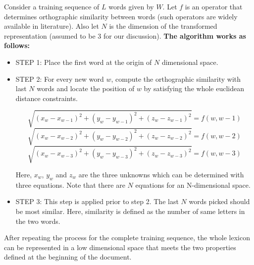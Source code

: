 \documentclass[a4paper, 11pt, oneside]{Thesis}  %
\begin{document}
Consider a training sequence of \(L\) words given by \(W\). Let \(f\) is an operator that determines orthographic similarity between words (such operators are widely available in literature). Also let \(N\) is the dimension of the transformed representation (assumed to be 3 for our discussion). \textbf{The algorithm works as follows:}

\begin{itemize}
\item STEP 1: Place the first word at the origin of \(N\) dimensional space.
\item STEP 2: For every new word \(w\), compute the orthographic similarity with last \(N\) words and locate the position of \(w\) by satisfying the whole euclidean distance constraints.

\begin{equation}
{\sqrt{(x_w - x_{w-1})^2 + (y_w - y_{w-1})^2 + (z_w - z_{w-1})^2} = f(w, w-1)}
\end{equation}
\begin{equation}
{\sqrt{(x_w - x_{w-2})^2 + (y_w - y_{w-2})^2 + (z_w - z_{w-2})^2} = f(w, w-2)}
\end{equation}
\begin{equation}
{\sqrt{(x_w - x_{w-3})^2 + (y_w - y_{w-3})^2 + (z_w - z_{w-3})^2} = f(w, w-3)}
\end{equation}

\noindent Here, \(x_w\), \(y_w\) and \(z_w\) are the three unknowns which can be determined with three equations. Note that there are \(N\) equations for an N-dimensional space.

\item STEP 3: This step is applied prior to step 2. The last \(N\) words picked should be most similar. Here, similarity is defined as the number of same letters in the two words.
\end{itemize}

After repeating the process for the complete training sequence, the whole lexicon can be represented in a low dimensional space that meets the two properties defined at the beginning of the document.
\end{document}
